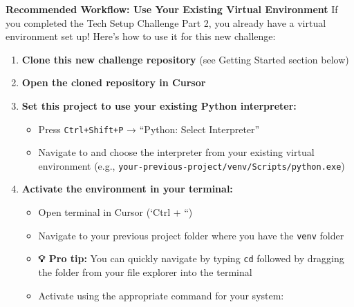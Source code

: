\documentclass[
  letterpaper,
  DIV=11,
  numbers=noendperiod]{scrartcl}
\providecommand{\tightlist}{%
  \setlength{\itemsep}{0pt}\setlength{\parskip}{0pt}}
\begin{document}
\begin{tcolorbox}[enhanced jigsaw, bottomtitle=1mm, opacitybacktitle=0.6, toptitle=1mm, colbacktitle=quarto-callout-important-color!10!white, breakable, coltitle=black, bottomrule=.15mm, left=2mm, colframe=quarto-callout-important-color-frame, colback=white, title=\textcolor{quarto-callout-important-color}{\faExclamation}\hspace{0.5em}{🎯 Note on Python Usage}, leftrule=.75mm, arc=.35mm, rightrule=.15mm, opacityback=0, toprule=.15mm, titlerule=0mm]

\textbf{Recommended Workflow: Use Your Existing Virtual Environment} If
you completed the Tech Setup Challenge Part 2, you already have a
virtual environment set up! Here's how to use it for this new challenge:

\begin{enumerate}
\def\labelenumi{\arabic{enumi}.}
\tightlist
\item
  \textbf{Clone this new challenge repository} (see Getting Started
  section below)
\item
  \textbf{Open the cloned repository in Cursor}
\item
  \textbf{Set this project to use your existing Python interpreter:}

  \begin{itemize}
  \tightlist
  \item
    Press \texttt{Ctrl+Shift+P} → ``Python: Select Interpreter''
  \item
    Navigate to and choose the interpreter from your existing virtual
    environment (e.g.,
    \texttt{your-previous-project/venv/Scripts/python.exe})
  \end{itemize}
\item
  \textbf{Activate the environment in your terminal:}

  \begin{itemize}
  \tightlist
  \item
    Open terminal in Cursor (`Ctrl + ``)
  \item
    Navigate to your previous project folder where you have the
    \texttt{venv} folder
  \item
    \textbf{💡 Pro tip:} You can quickly navigate by typing \texttt{cd}
    followed by dragging the folder from your file explorer into the
    terminal
  \item
    Activate using the appropriate command for your system:


\end{itemize}
\end{enumerate}
\end{tcolorbox}
\end{document}
